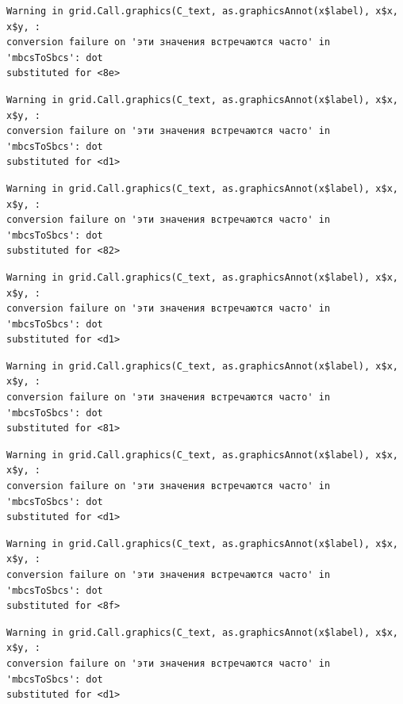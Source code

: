 \documentclass[
  letterpaper,
]{scrbook}
\theoremstyle{definition}
\theoremstyle{remark}
\begin{document}
\begin{verbatim}
Warning in grid.Call.graphics(C_text, as.graphicsAnnot(x$label), x$x, x$y, :
conversion failure on 'эти значения встречаются часто' in 'mbcsToSbcs': dot
substituted for <8e>
\end{verbatim}

\begin{verbatim}
Warning in grid.Call.graphics(C_text, as.graphicsAnnot(x$label), x$x, x$y, :
conversion failure on 'эти значения встречаются часто' in 'mbcsToSbcs': dot
substituted for <d1>
\end{verbatim}

\begin{verbatim}
Warning in grid.Call.graphics(C_text, as.graphicsAnnot(x$label), x$x, x$y, :
conversion failure on 'эти значения встречаются часто' in 'mbcsToSbcs': dot
substituted for <82>
\end{verbatim}

\begin{verbatim}
Warning in grid.Call.graphics(C_text, as.graphicsAnnot(x$label), x$x, x$y, :
conversion failure on 'эти значения встречаются часто' in 'mbcsToSbcs': dot
substituted for <d1>
\end{verbatim}

\begin{verbatim}
Warning in grid.Call.graphics(C_text, as.graphicsAnnot(x$label), x$x, x$y, :
conversion failure on 'эти значения встречаются часто' in 'mbcsToSbcs': dot
substituted for <81>
\end{verbatim}

\begin{verbatim}
Warning in grid.Call.graphics(C_text, as.graphicsAnnot(x$label), x$x, x$y, :
conversion failure on 'эти значения встречаются часто' in 'mbcsToSbcs': dot
substituted for <d1>
\end{verbatim}

\begin{verbatim}
Warning in grid.Call.graphics(C_text, as.graphicsAnnot(x$label), x$x, x$y, :
conversion failure on 'эти значения встречаются часто' in 'mbcsToSbcs': dot
substituted for <8f>
\end{verbatim}

\begin{verbatim}
Warning in grid.Call.graphics(C_text, as.graphicsAnnot(x$label), x$x, x$y, :
conversion failure on 'эти значения встречаются часто' in 'mbcsToSbcs': dot
substituted for <d1>
\end{verbatim}
\end{document}

